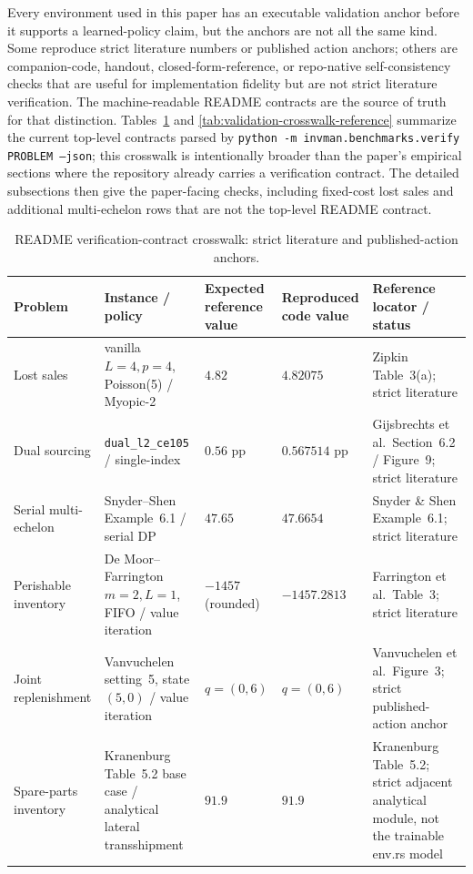 \documentclass[11pt]{article}
\begin{document}
Every environment used in this paper has an executable validation anchor before it supports a
learned-policy claim, but the anchors are not all the same kind. Some reproduce strict literature
numbers or published action anchors; others are companion-code, handout, closed-form-reference, or
repo-native self-consistency checks that are useful for implementation fidelity but are not strict
literature verification. The machine-readable README contracts are the source of truth for that
distinction. Tables~\ref{tab:validation-crosswalk-strict} and
\ref{tab:validation-crosswalk-reference} summarize the current top-level contracts parsed by
\texttt{python -m invman.benchmarks.verify PROBLEM --json}; this crosswalk is intentionally broader
than the paper's empirical sections where the repository already carries a verification contract. The
detailed subsections then give the paper-facing checks, including fixed-cost lost sales and
additional multi-echelon rows that are not the top-level README contract.

\begin{table}[!htbp]
\centering
\scriptsize
\setlength{\tabcolsep}{3pt}
\caption{README verification-contract crosswalk: strict literature and published-action anchors.}
\label{tab:validation-crosswalk-strict}
\begin{tabular}{p{}p{}p{}p{}p{}}
\toprule
Problem & Instance / policy & Expected reference value & Reproduced code value & Reference locator / status \\
\midrule
Lost sales & vanilla $L=4,p=4$, Poisson(5) / Myopic-2 & $4.82$ & $4.82075$ & Zipkin Table~3(a); strict literature \\
Dual sourcing & \texttt{dual\_l2\_ce105} / single-index & $0.56$ pp & $0.567514$ pp & Gijsbrechts et al.\ Section~6.2 / Figure~9; strict literature \\
Serial multi-echelon & Snyder--Shen Example~6.1 / serial DP & $47.65$ & $47.6654$ & Snyder \& Shen Example~6.1; strict literature \\
Perishable inventory & De Moor--Farrington $m=2,L=1$, FIFO / value iteration & $-1457$ (rounded) & $-1457.2813$ & Farrington et al.\ Table~3; strict literature \\
Joint replenishment & Vanvuchelen setting~5, state $(5,0)$ / value iteration & $q=(0,6)$ & $q=(0,6)$ & Vanvuchelen et al.\ Figure~3; strict published-action anchor \\
Spare-parts inventory & Kranenburg Table~5.2 base case / analytical lateral transshipment & $91.9$ & $91.9$ & Kranenburg Table~5.2; strict adjacent analytical module, not the trainable env.rs model \\
\bottomrule
\end{tabular}
\end{table}
\FloatBarrier
\end{document}
